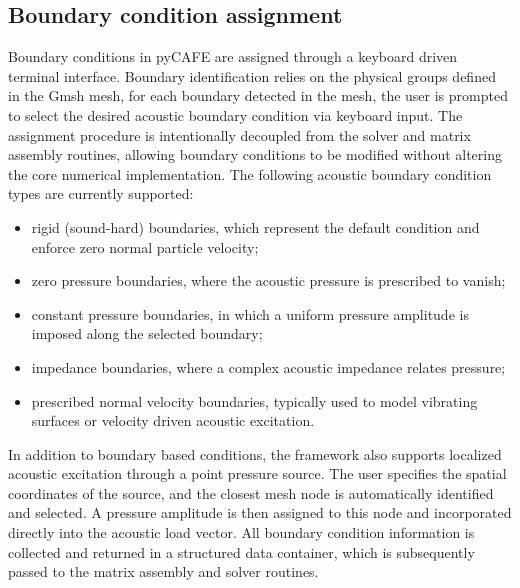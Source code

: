 \documentclass{jors}
\begin{document}
\subsection*{Boundary condition assignment}
Boundary conditions in pyCAFE are assigned through a keyboard driven terminal interface. Boundary identification relies on the physical groups defined in the Gmsh mesh, for each boundary detected in the mesh, the user is prompted to select the desired acoustic boundary condition via keyboard input. The assignment procedure is intentionally decoupled from the solver and matrix assembly routines, allowing boundary conditions to be modified without altering the core numerical implementation. The following acoustic boundary condition types are currently supported: 
\begin{itemize}
    \item rigid (sound-hard) boundaries, which represent the default condition and enforce zero normal particle velocity;
    \item zero pressure boundaries, where the acoustic pressure is prescribed to vanish;
    \item constant pressure boundaries, in which a uniform pressure amplitude is imposed along the selected boundary;
    \item  impedance boundaries, where a complex acoustic impedance relates pressure;
    \item prescribed normal velocity boundaries, typically used to model vibrating surfaces or velocity driven acoustic excitation.
\end{itemize}
In addition to boundary based conditions, the framework also supports localized acoustic excitation through a point pressure source. The user specifies the spatial coordinates of the source, and the closest mesh node is automatically identified and selected. A pressure amplitude is then assigned to this node and incorporated directly into the acoustic load vector. All boundary condition information is collected and returned in a structured data container, which is subsequently passed to the matrix assembly and solver routines.
\end{document}
